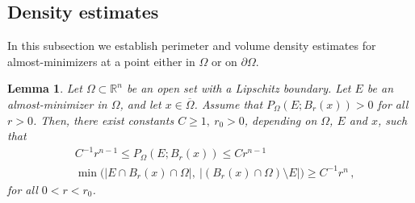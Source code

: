 \documentclass[a4paper,reqno,11pt]{amsart}
\newtheorem{lemma}[theorem]{Lemma}
\newcommand{\R}{\mathbb{R}}
\newcommand{\de}{\partial}
\newcommand{\pr}{P_{\Omega}}
\begin{document}
\subsection{Density estimates} In this subsection we establish perimeter and volume density estimates for almost-minimizers at a point either in $\Omega$ or on $\de \Omega$.
\begin{lemma}\label{lem:density}
Let $\Omega\subset \R^{n}$ be an open set with a Lipschitz boundary. Let $E$ be an almost-minimizer in $\Omega$, and let $x\in \overline{\Omega}$. Assume that $\pr(E;B_{r}(x)) > 0$ for all $r > 0$. Then, there exist constants $C \ge 1,\ r_{0} > 0$, depending on $\Omega$, $E$ and $x$, such that
		\begin{align}
			\label{eq:densityper}
			&C^{-1}r^{n-1} \le \pr(E;B_{r}(x)) \le Cr^{n-1}\\
			\label{eq:densityvol}
			&\min\big(|E\cap B_{r}(x)\cap \Omega|,\ |(B_{r}(x)\cap \Omega)\setminus E|\big) \ge C^{-1}r^{n}\,,
		\end{align}
		for all $0 < r < r_{0}$.
\end{lemma}
\end{document}
